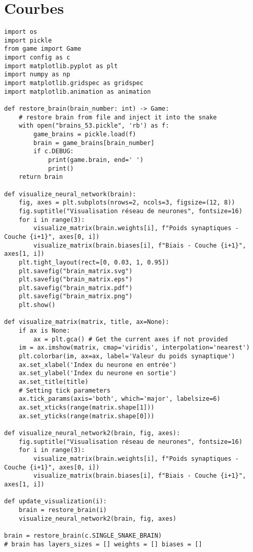 \documentclass[11pt,a4paper]{article}
\begin{document}
\section{Courbes}

\begin{verbatim}
import os
import pickle
from game import Game
import config as c
import matplotlib.pyplot as plt
import numpy as np
import matplotlib.gridspec as gridspec
import matplotlib.animation as animation

def restore_brain(brain_number: int) -> Game:
    # restore brain from file and inject it into the snake
    with open("brains_53.pickle", 'rb') as f:
        game_brains = pickle.load(f)
        brain = game_brains[brain_number]
        if c.DEBUG:
            print(game.brain, end=' ')
            print()
    return brain

def visualize_neural_network(brain):
    fig, axes = plt.subplots(nrows=2, ncols=3, figsize=(12, 8))
    fig.suptitle("Visualisation réseau de neurones", fontsize=16)
    for i in range(3):
        visualize_matrix(brain.weights[i], f"Poids synaptiques - Couche {i+1}", axes[0, i])
        visualize_matrix(brain.biases[i], f"Biais - Couche {i+1}", axes[1, i])
    plt.tight_layout(rect=[0, 0.03, 1, 0.95])
    plt.savefig("brain_matrix.svg")
    plt.savefig("brain_matrix.eps")
    plt.savefig("brain_matrix.pdf")
    plt.savefig("brain_matrix.png")
    plt.show()

def visualize_matrix(matrix, title, ax=None):
    if ax is None:
        ax = plt.gca() # Get the current axes if not provided
    im = ax.imshow(matrix, cmap='viridis', interpolation='nearest')
    plt.colorbar(im, ax=ax, label='Valeur du poids synaptique')
    ax.set_xlabel('Index du neurone en entrée')
    ax.set_ylabel('Index du neurone en sortie')
    ax.set_title(title)
    # Setting tick parameters
    ax.tick_params(axis='both', which='major', labelsize=6)
    ax.set_xticks(range(matrix.shape[1]))
    ax.set_yticks(range(matrix.shape[0]))

def visualize_neural_network2(brain, fig, axes):
    fig.suptitle("Visualisation réseau de neurones", fontsize=16)
    for i in range(3):
        visualize_matrix(brain.weights[i], f"Poids synaptiques - Couche {i+1}", axes[0, i])
        visualize_matrix(brain.biases[i], f"Biais - Couche {i+1}", axes[1, i])

def update_visualization(i):
    brain = restore_brain(i)
    visualize_neural_network2(brain, fig, axes)

brain = restore_brain(c.SINGLE_SNAKE_BRAIN)
# brain has layers_sizes = [] weights = [] biases = []


\end{verbatim}
\end{document}

